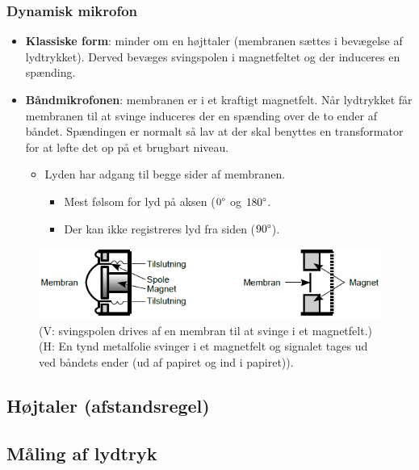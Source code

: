 \subsubsection{Dynamisk mikrofon}
\begin{itemize}
	\item \textbf{Klassiske form}: minder om en højttaler (membranen sættes i bevægelse af lydtrykket). Derved bevæges svingspolen i magnetfeltet
	og der induceres en spænding.
	\item \textbf{Båndmikrofonen}: membranen er i et kraftigt magnetfelt. Når lydtrykket får membranen til at svinge induceres der en spænding over de to ender af båndet. Spændingen er normalt så lav at der skal benyttes en transformator for at løfte det op på et brugbart niveau. 
	\begin{itemize}
		\item Lyden har adgang til begge sider af membranen.
		\begin{itemize}
			\item Mest følsom for lyd på aksen ($0\degree$ og $180\degree$.
			\item Der kan ikke registreres lyd fra siden ($90\degree$).
		\end{itemize}
	\end{itemize} 
\end{itemize}
\begin{figure} [H]
	\centering
	\includegraphics[width=.9\linewidth]{graphics/12.png}
	\caption{(V: svingspolen drives af en membran til at svinge i et magnetfelt.) (H: En tynd metalfolie svinger i et magnetfelt og signalet tages ud ved båndets ender (ud af papiret og ind i papiret)).}
	\label{fig:12}
\end{figure}

\subsection{Højtaler (afstandsregel)}

\subsection{Måling af lydtryk}


